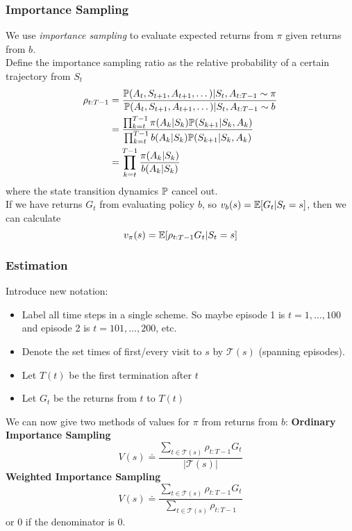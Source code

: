 \subsubsection*{Importance Sampling}
We use \emph{importance sampling} to evaluate expected returns from $\pi$ given returns from $b$.\\

Define the importance sampling ratio as the relative probability of a certain trajectory from $S_t$
\begin{align}
    \rho_{t:T-1} &= \frac{\P{}(A_t, S_{t+1}, A_{t+1}, \dots)| S_t, A_{t:T-1} \sim \pi}{\P{}(A_t, S_{t+1}, A_{t+1}, \dots)| S_t, A_{t:T-1} \sim b} \\
                 &= \frac{\prod_{k=t}^{T-1}\pi(A_k|S_k)\P{}(S_{k+1}|S_k, A_k)}{\prod_{k=t}^{T-1}b(A_k|S_k)\P{}(S_{k+1}|S_k, A_k)}\\
                 &=\prod_{k=t}^{T-1}\frac{\pi(A_k|S_k)}{b(A_k|S_k)}
\end{align}
where the state transition dynamics $\P{}$ cancel out.\\

If we have returns $G_t$ from evaluating policy $b$, so $v_b(s) = \E[G_t|S_t=s]$, then we can calculate
\[
    v_\pi(s) = \E[\rho_{t:T-1}G_t|S_t=s]
\]

\subsubsection*{Estimation}
Introduce new notation:
\begin{itemize}
    \item Label all time steps in a single scheme. So maybe episode 1 is $t=1, \dots, 100$ and episode 2 is $t = 101, \dots, 200$, etc.
    \item Denote the set times of first/every visit to $s$ by $\mathcal{T}(s)$ (spanning episodes).
    \item Let $T(t)$ be the first termination after $t$
    \item Let $G_t$ be the returns from $t$ to $T(t)$
\end{itemize}

We can now give two methods of values for $\pi$ from returns from $b$:
{\bfseries{Ordinary Importance Sampling}}
\begin{equation}
    V(s) \doteq \frac{\sum_{t\in \mathcal{T}(s)} \rho_{t:T-1}G_t}{|\mathcal{T}(s)|}
\end{equation}
{\bfseries{Weighted Importance Sampling}}
\begin{equation}
    V(s) \doteq \frac{\sum_{t\in \mathcal{T}(s)} \rho_{t:T-1}G_t}{\sum_{t\in \mathcal{T}(s)} \rho_{t:T-1}}
\end{equation}
or 0 if the denominator is 0.\\

